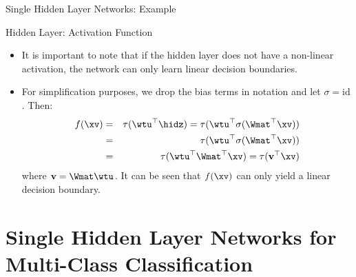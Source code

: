 \begin{frame} {Single Hidden Layer Networks: Example}
\begin{figure}
  \end{figure}
\end{frame}

\begin{frame} {Hidden Layer: Activation Function}
\begin{itemize}
\item It is important to note that if the hidden layer does not have a non-linear activation, the network can only learn linear decision boundaries.
\item For simplification purposes, we drop the bias terms in notation and let $\sigma = \text{id}$. Then:
    \begin{eqnarray*}
        f(\xv) & = & \tau(\wtu^\top \hidz) = \tau(\wtu^\top \sigma(\Wmat^\top \xv)) \\
         & = & \tau(\wtu^\top \sigma(\Wmat^\top \xv)) \\
         & = & \tau(\wtu^\top\Wmat^\top \xv) = \tau(\mathbf{v}^\top \xv)
      \end{eqnarray*}
      where $ \mathbf{v} = \Wmat\wtu$. It can be seen that $f(\xv)$ can only yield a linear decision boundary.
  \end{itemize}
\end{frame}

\section{Single Hidden Layer Networks for Multi-Class Classification}

